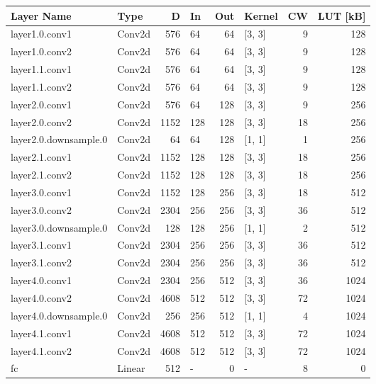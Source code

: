 \begin{table}
\centering
\begin{tabular}{llrlrlrr}
\toprule
Layer Name & Type & D & In & Out & Kernel & CW & LUT [kB] \\
\midrule
layer1.0.conv1 & Conv2d & 576 & 64 & 64 & [3, 3] & 9 & 128 \\
layer1.0.conv2 & Conv2d & 576 & 64 & 64 & [3, 3] & 9 & 128 \\
layer1.1.conv1 & Conv2d & 576 & 64 & 64 & [3, 3] & 9 & 128 \\
layer1.1.conv2 & Conv2d & 576 & 64 & 64 & [3, 3] & 9 & 128 \\
layer2.0.conv1 & Conv2d & 576 & 64 & 128 & [3, 3] & 9 & 256 \\
layer2.0.conv2 & Conv2d & 1152 & 128 & 128 & [3, 3] & 18 & 256 \\
layer2.0.downsample.0 & Conv2d & 64 & 64 & 128 & [1, 1] & 1 & 256 \\
layer2.1.conv1 & Conv2d & 1152 & 128 & 128 & [3, 3] & 18 & 256 \\
layer2.1.conv2 & Conv2d & 1152 & 128 & 128 & [3, 3] & 18 & 256 \\
layer3.0.conv1 & Conv2d & 1152 & 128 & 256 & [3, 3] & 18 & 512 \\
layer3.0.conv2 & Conv2d & 2304 & 256 & 256 & [3, 3] & 36 & 512 \\
layer3.0.downsample.0 & Conv2d & 128 & 128 & 256 & [1, 1] & 2 & 512 \\
layer3.1.conv1 & Conv2d & 2304 & 256 & 256 & [3, 3] & 36 & 512 \\
layer3.1.conv2 & Conv2d & 2304 & 256 & 256 & [3, 3] & 36 & 512 \\
layer4.0.conv1 & Conv2d & 2304 & 256 & 512 & [3, 3] & 36 & 1024 \\
layer4.0.conv2 & Conv2d & 4608 & 512 & 512 & [3, 3] & 72 & 1024 \\
layer4.0.downsample.0 & Conv2d & 256 & 256 & 512 & [1, 1] & 4 & 1024 \\
layer4.1.conv1 & Conv2d & 4608 & 512 & 512 & [3, 3] & 72 & 1024 \\
layer4.1.conv2 & Conv2d & 4608 & 512 & 512 & [3, 3] & 72 & 1024 \\
fc & Linear & 512 & - & 0 & - & 8 & 0 \\
\bottomrule
\end{tabular}
\end{table}
